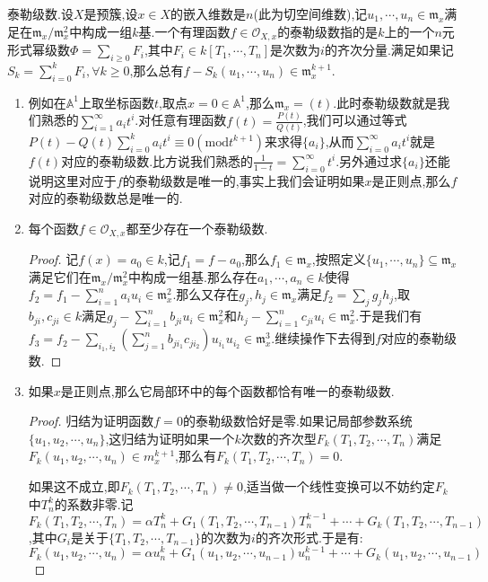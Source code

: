 泰勒级数.设$X$是预簇,设$x\in X$的嵌入维数是$n$(此为切空间维数),记$u_1,\cdots,u_n\in\mathfrak{m}_x$满足在$\mathfrak{m}_x/\mathfrak{m}_x^2$中构成一组$k$基.一个有理函数$f\in\mathscr{O}_{X,x}$的泰勒级数指的是$k$上的一个$n$元形式幂级数$\Phi=\sum_{i\ge0}F_i$,其中$F_i\in k[T_1,\cdots,T_n]$是次数为$i$的齐次分量.满足如果记$S_k=\sum_{i=0}^kF_i,\forall k\ge0$,那么总有$f-S_k(u_1,\cdots,u_n)\in\mathfrak{m}_x^{k+1}$.
\begin{enumerate}
	\item 例如在$\mathbb{A}^1$上取坐标函数$t$,取点$x=0\in\mathbb{A}^1$,那么$\mathfrak{m}_x=(t)$.此时泰勒级数就是我们熟悉的$\sum_{i=1}^{\infty}a_it^i$.对任意有理函数$f(t)=\frac{P(t)}{Q(t)}$,我们可以通过等式$P(t)-Q(t)\sum_{i=0}^ka_it^i\equiv0(\mathrm{mod}t^{k+1})$来求得$\{a_i\}$,从而$\sum_{i=0}^{\infty}a_it^i$就是$f(t)$对应的泰勒级数.比方说我们熟悉的$\frac{1}{1-t}=\sum_{i=0}^{\infty}t^i$.另外通过求$\{a_i\}$还能说明这里对应于$f$的泰勒级数是唯一的,事实上我们会证明如果$x$是正则点,那么$f$对应的泰勒级数总是唯一的.
	\item 每个函数$f\in\mathscr{O}_{X,x}$都至少存在一个泰勒级数.
	\begin{proof}
	
	记$f(x)=a_0\in k$,记$f_1=f-a_0$,那么$f_1\in\mathfrak{m}_x$,按照定义$\{u_1,\cdots,u_n\}\subseteq\mathfrak{m}_x$满足它们在$\mathfrak{m}_x/\mathfrak{m}_x^2$中构成一组基.那么存在$a_1,\cdots,a_n\in k$使得$f_2=f_1-\sum_{i=1}^na_iu_i\in\mathfrak{m}_x^2$.那么又存在$g_j,h_j\in\mathfrak{m}_x$满足$f_2=\sum_jg_jh_j$,取$b_{ji},c_{ji}\in k$满足$g_j-\sum_{i=1}^nb_{ji}u_i\in\mathfrak{m}_x^2$和$h_j-\sum_{i=1}^nc_{ji}u_i\in\mathfrak{m}_x^2$.于是我们有$f_3=f_2-\sum_{i_1,i_2}\left(\sum_{j=1}^nb_{ji_1}c_{ji_2}\right)u_{i_1}u_{i_2}\in\mathfrak{m}_x^3$.继续操作下去得到$f$对应的泰勒级数.
	\end{proof}
	\item 如果$x$是正则点,那么它局部环中的每个函数都恰有唯一的泰勒级数.
	\begin{proof}
		
		归结为证明函数$f=0$的泰勒级数恰好是零.如果记局部参数系统$\{u_1,u_2,\cdots,u_n\}$,这归结为证明如果一个$k$次数的齐次型$F_k(T_1,T_2,\cdots,T_n)$满足$F_k(u_1,u_2,\cdots,u_n)\in m_x^{k+1}$,那么有$F_k(T_1,T_2,\cdots,T_n)=0$.
		
		\qquad
		
		如果这不成立,即$F_k(T_1,T_2,\cdots,T_n)\not=0$,适当做一个线性变换可以不妨约定$F_k$中$T_n^k$的系数非零.记$F_k(T_1,T_2,\cdots,T_n)=\alpha T_n^k+G_1(T_1,T_2,\cdots,T_{n-1})T_n^{k-1}+\cdots+G_k(T_1,T_2,\cdots,T_{n-1})$,其中$G_i$是关于$\{T_1,T_2,\cdots,T_{n-1}\}$的次数为$i$的齐次形式.于是有:
		$$F_k(u_1,u_2,\cdots,u_n)=\alpha u_n^k+G_1(u_1,u_2,\cdots,u_{n-1})u_n^{k-1}+\cdots+G_k(u_1,u_2,\cdots,u_{n-1})$$
		

\end{proof}
\end{enumerate}
